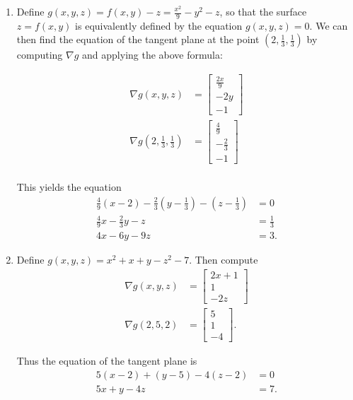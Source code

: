  \begin{enumerate}
  \item Define $g(x,y,z) = f(x,y) - z = \frac{x^2}{9} - y^2 - z$, so that the
   surface  $z = f(x,y)$ is equivalently defined by the equation
   $g(x,y,z) = 0$.
   We can then find the equation of the tangent plane at the point
   $(2, \frac{1}{3}, \frac{1}{3})$ by computing $\nabla g$ and applying the
   above formula:

   \begin{align*}
    \nabla g(x,y,z) &=
     \begin{bmatrix} \frac{2x}{9} \\ -2y \\ -1 \end{bmatrix} \\
    \nabla g(2,\frac{1}{3},\frac{1}{3}) &=
     \begin{bmatrix} \frac{4}{9} \\ -\frac{2}{3} \\ -1 \end{bmatrix} \\
   \end{align*}

   This yields the equation
   \begin{align*}
    \frac{4}{9}(x - 2) - \frac{2}{3}(y - \frac{1}{3}) - (z - \frac{1}{3}) &= 0 \\
    \frac{4}{9}x - \frac{2}{3}y - z &= \frac{1}{3} \\
    4x - 6y - 9z &= 3.
   \end{align*}

  \item Define $g(x,y,z) = x^2 + x + y - z^2 - 7$.  Then compute
   \begin{align*}
    \nabla g(x,y,z) &= \begin{bmatrix} 2x + 1 \\ 1 \\ -2z \end{bmatrix} \\
    \nabla g(2,5,2) &= \begin{bmatrix} 5 \\ 1 \\ -4 \end{bmatrix}.
   \end{align*}

   Thus the equation of the tangent plane is
   \begin{align*}
    5(x - 2) + (y - 5) - 4(z - 2) &= 0 \\
    5x + y - 4z &= 7.
   \end{align*}
 \end{enumerate}

